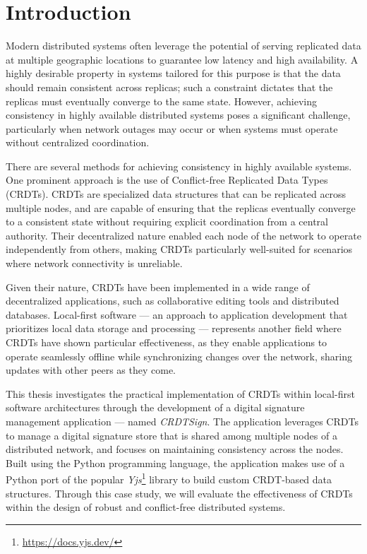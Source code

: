 \chapter{Introduction}

Modern distributed systems often leverage the potential of serving replicated data at multiple geographic
locations to guarantee low latency and high availability. A highly desirable property in systems tailored for this
purpose is that the data should remain consistent across replicas; such a constraint dictates that the replicas
must eventually converge to the same state. However, achieving consistency in highly available distributed systems
poses a significant challenge, particularly when network outages may occur or when systems must operate without
centralized coordination. 

There are several methods for achieving consistency in highly available systems. One prominent approach is the use
of Conflict-free Replicated Data Types (CRDTs). CRDTs are specialized data structures that can be replicated across
multiple nodes, and are capable of ensuring that the replicas eventually converge to a consistent state without
requiring explicit coordination from a central authority. Their decentralized nature enabled each node of the
network to operate independently from others, making CRDTs particularly well-suited for scenarios where network
connectivity is unreliable.

Given their nature, CRDTs have been implemented in a wide range of decentralized applications, such as
collaborative editing tools and distributed databases. Local-first software --- an approach to application
development that prioritizes local data storage and processing --- represents another field where CRDTs have shown
particular effectiveness, as they enable applications to operate seamlessly offline while synchronizing changes
over the network, sharing updates with other peers as they come.

This thesis investigates the practical implementation of CRDTs within local-first software architectures through the
development of a digital signature management application --- named \textit{CRDTSign}. The application leverages CRDTs
to manage a digital signature store that is shared among multiple nodes of a distributed network, and focuses on
maintaining consistency across the nodes. Built using the Python programming language, the application makes use of a
Python port of the popular \textit{Yjs}\footnote{\url{https://docs.yjs.dev/}} library to build custom CRDT-based data
structures. Through this case study, we will evaluate the effectiveness of CRDTs within the design of robust and
conflict-free distributed systems.

